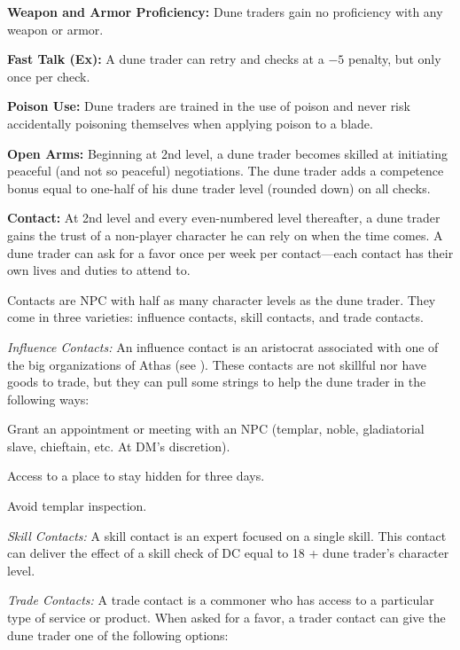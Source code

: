 {
\textbf{Weapon and Armor Proficiency:} Dune traders gain no proficiency with any weapon or armor.

\textbf{Fast Talk (Ex):} A dune trader can retry  and  checks at a $-5$ penalty, but only once per check.

\textbf{Poison Use:} Dune traders are trained in the use of poison and never risk accidentally poisoning themselves when applying poison to a blade.

\textbf{Open Arms:} Beginning at 2nd level, a dune trader becomes skilled at initiating peaceful (and not so peaceful) negotiations. The dune trader adds a competence bonus equal to one-half of his dune trader level (rounded down) on all  checks.

\textbf{Contact:} At 2nd level and every even-numbered level thereafter, a dune trader gains the trust of a non-player character he can rely on when the time comes. A dune trader can ask for a favor once per week per contact---each contact has their own lives and duties to attend to.

Contacts are NPC with half as many character levels as the dune trader. They come in three varieties: influence contacts, skill contacts, and trade contacts.

\textit{Influence Contacts:} An influence contact is an aristocrat associated with one of the big organizations of Athas (see ). These contacts are not skillful nor have goods to trade, but they can pull some strings to help the dune trader in the following ways: 

\begin{itemize*}
\item Grant an appointment or meeting with an NPC (templar, noble, gladiatorial slave, chieftain, etc. At DM's discretion).
\item Access to a place to stay hidden for three days.
\item Avoid templar inspection.
\end{itemize*}

\textit{Skill Contacts:} A skill contact is an expert focused on a single skill. This contact can deliver the effect of a skill check of DC equal to 18 + \onehalf dune trader's character level.

\textit{Trade Contacts:} A trade contact is a commoner who has access to a particular type of service or product. When asked for a favor, a trader contact can give the dune trader one of the following options:

}
